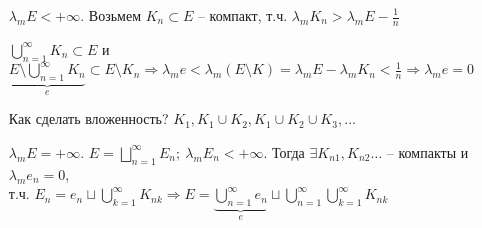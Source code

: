 \documentclass[12pt]{article}
\begin{document}
\begin{itemize}
    \item[$\lambda_m E < + \infty$. ] Возьмем $K_n \subset E$ -- компакт, т.ч. $\lambda_m K_n > \lambda_m E - \frac{1}{n}$
    
    $\bigcup\limits_{n = 1}^\infty K_n \subset E$ и $\underbrace{E \setminus \bigcup\limits_{n = 1}^\infty K_n}_{e} \subset E \setminus K_n \Rightarrow \lambda_m e < \lambda_m (E \setminus K) = \lambda_m E - \lambda_m K_n < \frac{1}{n} \Rightarrow \lambda_m e = 0$

    Как сделать вложенность? $K_1, K_1 \cup K_2, K_1 \cup K_2 \cup K_3, \ldots$

    \item[$\lambda_m E = + \infty$. ] $E = \bigsqcup\limits_{n = 1}^\infty E_n;\ \lambda_m E_n < + \infty$. Тогда $\exists K_{n1}, K_{n2} \ldots$ -- компакты и $\lambda_m e_n = 0$, \\
    т.ч. $E_n = e_n \sqcup \bigcup\limits_{k = 1}^\infty K_{nk} \Rightarrow E = \underbrace{\bigcup\limits_{n = 1}^\infty e_n}_{e} \sqcup \bigcup\limits_{n = 1}^\infty \bigcup\limits_{k = 1}^\infty K_{nk}$
\end{itemize}
\end{document}
